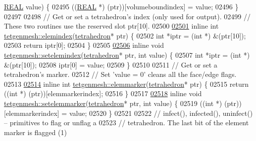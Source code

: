 \begin{DoxyCode}
      \hyperlink{tetgen_8h_a4b654506f18b8bfd61ad2a29a7e38c25}{REAL} value) \{
02495   ((\hyperlink{tetgen_8h_a4b654506f18b8bfd61ad2a29a7e38c25}{REAL} *) (ptr))[volumeboundindex] = value;
02496 \}
02497 
02498 \textcolor{comment}{// Get or set a tetrahedron's index (only used for output).}
02499 \textcolor{comment}{//    These two routines use the reserved slot ptr[10].}
02500 
\hypertarget{tetgen_8h_source.tex_l02501}{}\hyperlink{classtetgenmesh_a0a12e21d9d363bc5aef59c1b1e51e5f2}{02501} \textcolor{keyword}{inline} \textcolor{keywordtype}{int} \hyperlink{classtetgenmesh_a0a12e21d9d363bc5aef59c1b1e51e5f2}{tetgenmesh::elemindex}(\hyperlink{classtetgenmesh_a6a12b1c0d1834ca941d16c62e949e5e3}{tetrahedron}* ptr) \{
02502   \textcolor{keywordtype}{int} *iptr = (\textcolor{keywordtype}{int} *) &(ptr[10]);
02503   \textcolor{keywordflow}{return} iptr[0];
02504 \}
02505 
\hypertarget{tetgen_8h_source.tex_l02506}{}\hyperlink{classtetgenmesh_a2cbb9d3c9692a5769ad8e9f20263a3ad}{02506} \textcolor{keyword}{inline} \textcolor{keywordtype}{void} \hyperlink{classtetgenmesh_a2cbb9d3c9692a5769ad8e9f20263a3ad}{tetgenmesh::setelemindex}(\hyperlink{classtetgenmesh_a6a12b1c0d1834ca941d16c62e949e5e3}{tetrahedron}* ptr, \textcolor{keywordtype}{int} value) \{
02507   \textcolor{keywordtype}{int} *iptr = (\textcolor{keywordtype}{int} *) &(ptr[10]);
02508   iptr[0] = value;
02509 \}
02510 
02511 \textcolor{comment}{// Get or set a tetrahedron's marker. }
02512 \textcolor{comment}{//   Set 'value = 0' cleans all the face/edge flags.}
02513 
\hypertarget{tetgen_8h_source.tex_l02514}{}\hyperlink{classtetgenmesh_aea9c7e2e0f281f543c9215dcf4694512}{02514} \textcolor{keyword}{inline} \textcolor{keywordtype}{int} \hyperlink{classtetgenmesh_aea9c7e2e0f281f543c9215dcf4694512}{tetgenmesh::elemmarker}(\hyperlink{classtetgenmesh_a6a12b1c0d1834ca941d16c62e949e5e3}{tetrahedron}* ptr) \{
02515   \textcolor{keywordflow}{return} ((\textcolor{keywordtype}{int} *) (ptr))[elemmarkerindex];
02516 \}
02517 
\hypertarget{tetgen_8h_source.tex_l02518}{}\hyperlink{classtetgenmesh_acb8c694d2d20e494b14b9c9f520cd5c8}{02518} \textcolor{keyword}{inline} \textcolor{keywordtype}{void} \hyperlink{classtetgenmesh_acb8c694d2d20e494b14b9c9f520cd5c8}{tetgenmesh::setelemmarker}(\hyperlink{classtetgenmesh_a6a12b1c0d1834ca941d16c62e949e5e3}{tetrahedron}* ptr, \textcolor{keywordtype}{int} value) \{
02519   ((\textcolor{keywordtype}{int} *) (ptr))[elemmarkerindex] = value;
02520 \}
02521 
02522 \textcolor{comment}{// infect(), infected(), uninfect() -- primitives to flag or unflag a}
02523 \textcolor{comment}{//   tetrahedron. The last bit of the element marker is flagged (1)}

\end{DoxyCode}
